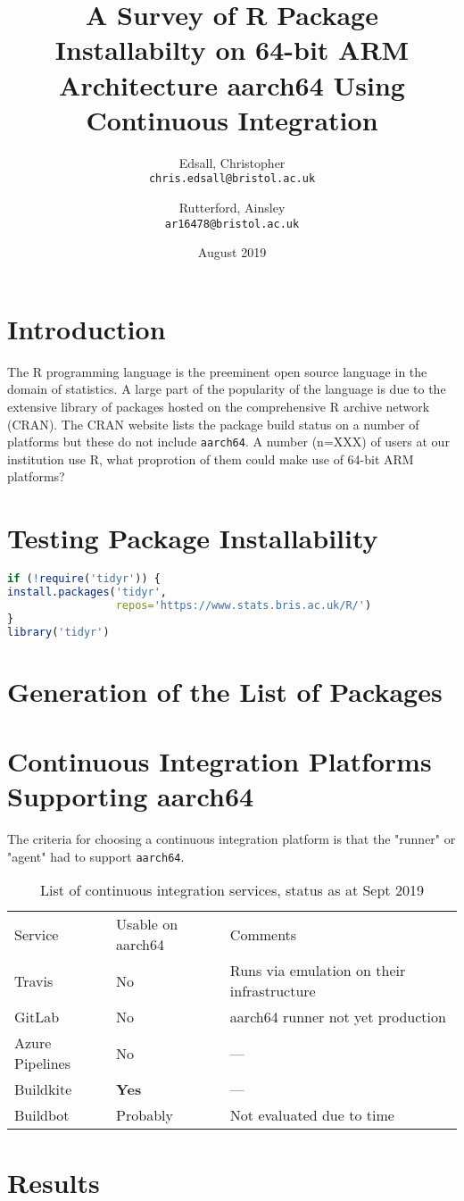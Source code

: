 \documentclass{article}
\title{A Survey of R Package Installabilty on 64-bit ARM Architecture aarch64 Using Continuous Integration}
\author{Edsall, Christopher\\
  \texttt{chris.edsall@bristol.ac.uk}
  \and
  Rutterford, Ainsley\\
  \texttt{ar16478@bristol.ac.uk}
}
\date{August 2019}
\begin{document}
\maketitle

\section{Introduction}
The R programming language is the preeminent open source language in the domain of statistics. A large part of the popularity of the language is due to the extensive library of packages hosted on the comprehensive R archive network (\textsc{CRAN}). The \textsc{CRAN} website lists the package build status on a number of platforms but these do not include \texttt{aarch64}. A number (n=XXX) of users at our institution use R, what proprotion of them could make use of 64-bit ARM platforms?

\section{Testing Package Installability}

\begin{lstlisting}[language=R, caption=Testing that package \texttt{tidyr} can be installed and loaded]
if (!require('tidyr')) {
install.packages('tidyr',
                 repos='https://www.stats.bris.ac.uk/R/')
}
library('tidyr')
\end{lstlisting}


\section{Generation of the List of Packages}

\section{Continuous Integration Platforms Supporting aarch64}

The criteria for choosing a continuous integration platform is that the "runner" or "agent" had to support \texttt{aarch64}.

\begin{table}[]
\begin{tabular}{lll}
\cline{1-3}
Service & Usable on aarch64 & Comments\\ \cline{1-3}
Travis & No & Runs via emulation on their infrastructure\\
GitLab & No & aarch64 runner not yet production\\
Azure Pipelines & No & ---\\
Buildkite & \textbf{Yes} & --- \\
Buildbot & Probably & Not evaluated due to time \\ \cline{1-3}
\end{tabular}
\caption{List of continuous integration services, status as at Sept 2019}
\label{tab:ci-services}
\end{table}

\section{Results}
\end{document}
